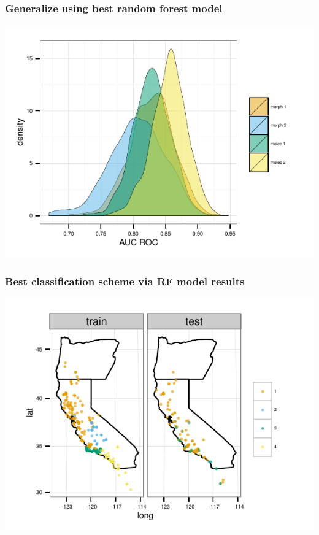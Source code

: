 \documentclass{beamer}\usepackage{graphicx, color}
\makeatletter
\def\maxwidth{ %
  \ifdim\Gin@nat@width>\linewidth
    \linewidth
  \else
    \Gin@nat@width
  \fi
}
\newenvironment{knitrout}{}{} %
\makeatother
\begin{document}

\begin{frame}
  \frametitle{Generalize using best random forest model}
\begin{knitrout}
\color{fgcolor}
\includegraphics[width=\maxwidth]{figure/unnamed-chunk-4} 

\end{knitrout}


\end{frame}

\begin{frame}
  \frametitle{Best classification scheme via RF model results}
\begin{knitrout}
\color{fgcolor}
\includegraphics[width=\maxwidth]{figure/unnamed-chunk-5} 

\end{knitrout}


\end{frame}
\end{document}
